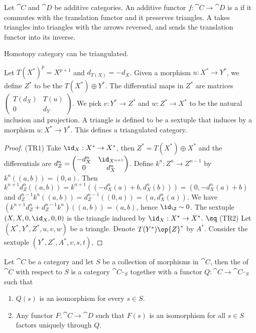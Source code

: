 \begin{definition}
    Let $\cat{C}$ and $\cat{D}$ be additive categories. An additive functor $f:\cat{C}\to\cat{D}$ is a  if it commutes with the translation functor and it preserves triangles. A  takes triangles into triangles with the arrows reversed, and sends the translation functor into its inverse.
\end{definition}
\par
Homotopy category can be triangulated.
\begin{proposition}
    Let $T{({X}^{*})}^{p}={X}^{p+1}$ and ${d}_{T(X)}=-{d}_{X}$. Given a morphism $u:{X}^{*}\to{Y}^{*}$, we define ${Z}^{*}$ to be the  $T({X}^{*})\oplus{Y}^{*}$. The differential maps in ${Z}^{*}$ are matrices $\begin{pmatrix}
        T({d}_{X}) & T(u) \\
        0 & {d}_{Y}
    \end{pmatrix}$. We pick $v:{Y}^{*}\to{Z}^{*}$ and $w:{Z}^{*}\to{X}^{*}$ to be the natural inclusion and projection. A triangle is defined to be a sextuple that induces by a morphism $u:{X}^{*}\to{Y}^{*}$. This defines a triangulated category.
\end{proposition}
\begin{proof}
    (TR1) Take ${\id}_{X}:{X}^{*}\to{X}^{*}$, then ${Z}^{*}=T({X}^{*})\oplus{X}^{*}$ and the differentials are ${d}_{Z}^{n}=\begin{pmatrix}
        -{d}_{X}^{n} & {\id}_{{X}^{n+1}} \\
        0 & {d}_{X}^{n}
    \end{pmatrix}$. Define ${k}^{n}:{Z}^{n}\to{Z}^{n-1}$ by ${k}^{n}((a,b))=(0,a)$. Then ${k}^{n+1}{d}_{Z}^{n}((a,b))={k}^{n+1}((-{d}_{X}^{n}(a)+b,{d}_{X}^{n}(b)))=(0,-{d}_{X}^{n}(a)+b)$ and ${d}_{Z}^{n-1}{k}^{n}((a,b))={d}_{Z}^{n-1}((0,a))=(a,{d}_{X}^{n}(a))$. We have $({k}^{n+1}{d}_{Z}^{n}+{d}_{Z}^{n-1}{k}^{n})((a,b))=(a,b)$, hence ${\id}_{\Z}\sim 0$. The sextuple $(X,X,0,{\id}_{X},0,0)$ is the triangle induced by ${\id}_{X}:{X}^{*}\to{X}^{*}$. $\sq$ (TR2) Let $({X}^{*},{Y}^{*},{Z}^{*},u,v,w)$ be a triangle. Denote $T({Y}^{*})\op{Z}^{*}$ by ${A}^{*}$. Consider the sextuple $({Y}^{*},{Z}^{*},{A}^{*},v,s,t)$, 
\end{proof}
\begin{definition}
    Let $\cat{C}$ be a category and let $S$ be a collection of morphisms in $\cat{C}$, then the  of $\cat{C}$ with respect to $S$ is a category ${\cat{C}}_{\cat{S}}$ together with a functor $Q:\cat{C}\to{\cat{C}}_{\cat{S}}$ such that 
    \begin{enumerate}
        \item $Q(s)$ is an isomorphism for every $s\in S$.
        \item Any functor $F:\cat{C}\to\cat{D}$ such that $F(s)$ is an isomorphism for all $s\in S$ factors uniquely through $Q$.
    \end{enumerate}
\end{definition}
